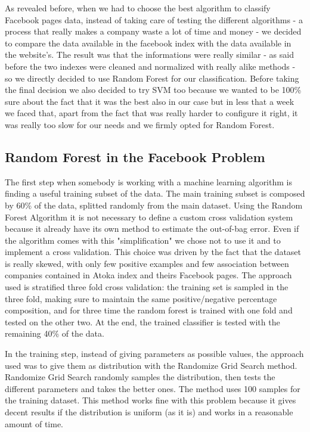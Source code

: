 As revealed before, when we had to choose the best algorithm to classify Facebook pages data, instead of taking care of testing the different algorithms - a process that really makes a company waste a lot of time and money -  we decided to compare the data available in the facebook index with the data available in the website's. The result was that the informations were really similar - as said before the two indexes were cleaned and normalized with really alike methods - so we directly decided to use Random Forest for our classification. Before taking the final decision we also decided to try SVM too because we wanted to be 100\% sure about the fact that it was the best also in our case but in less that a week we faced that, apart from the fact that was really harder to configure it right, it was really too slow for our needs and we firmly opted for Random Forest.


\subsection*{Random Forest in the Facebook Problem}

The first step when somebody is working with a machine learning algorithm is finding a useful training subset of the data. The main training subset is composed by 60\% of the data, splitted randomly from the main dataset.
Using the Random Forest Algorithm it is not necessary to define a custom cross validation system because it already have its own method to estimate the out-of-bag error. Even if the algorithm comes with this "simplification" we chose not to use it and to implement a cross validation. This choice was driven by the fact that the dataset is really skewed, with only few positive examples and few association between companies contained in Atoka index and theirs Facebook pages. The approach used is stratified three fold cross validation: the training set is sampled in the three fold, making sure to maintain the same positive/negative percentage composition, and for three time the random forest is trained with one fold and tested on the other two.
At the end, the trained classifier is tested with the remaining 40\% of the data.

In the training step, instead of giving parameters as possible values, the approach used was to give them as distribution with the Randomize Grid Search method. Randomize Grid Search randomly samples the distribution, then tests the different parameters and takes the better ones. The method uses 100 samples for the training dataset. This method works fine with this problem because it gives decent results if the distribution is uniform (as it is) and works in a reasonable amount of time.

